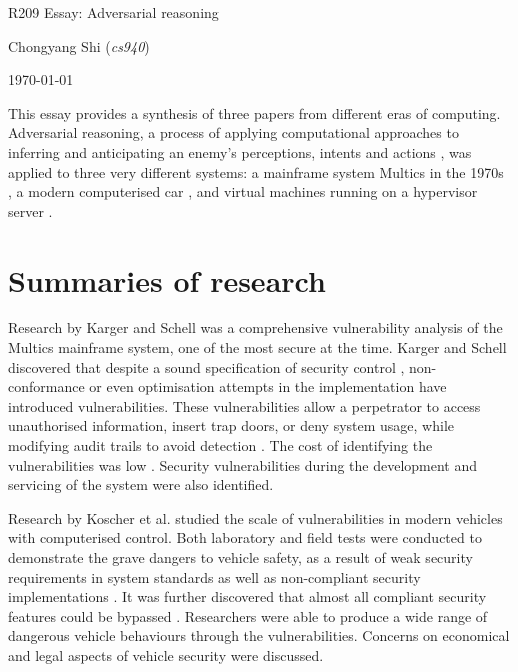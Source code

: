 \documentclass[11pt]{article}
\begin{document}
\centerline{\Large R209 Essay:  Adversarial reasoning}
\vspace{2em}
\centerline{\large Chongyang Shi (\emph{cs940})}
\vspace{1em}
\centerline{\large \today}
\vspace{1em}

This essay provides a synthesis of three papers from different eras of computing. Adversarial reasoning, a process of applying computational approaches to inferring and anticipating an enemy's perceptions, intents and actions \cite{kott2015toward}, was applied to three very different systems: a mainframe system Multics in the 1970s \cite{karger1974multics}, a modern computerised car \cite{koscher2010experimental}, and virtual machines running on a hypervisor server \cite{razavi2016flip}.

\section{Summaries of research}

Research by Karger and Schell \cite{karger1974multics} was a comprehensive vulnerability analysis of the Multics mainframe system, one of the most secure at the time. Karger and Schell discovered that despite a sound specification of security control \cite[3.1]{karger1974multics}, non-conformance \cite[3.2.1]{karger1974multics} or even optimisation attempts \cite[3.3.2]{karger1974multics} in the implementation have introduced vulnerabilities. These vulnerabilities allow a perpetrator to access unauthorised information, insert trap doors, or deny system usage, while modifying audit trails to avoid detection \cite[3.4.4]{karger1974multics}. The cost of identifying the vulnerabilities was low \cite[Tb. 3]{karger1974multics}. Security vulnerabilities during the development and servicing of the system were also identified. 

Research by Koscher et al. \cite{koscher2010experimental} studied the scale of vulnerabilities in modern vehicles with computerised control. Both laboratory and field tests were conducted to demonstrate the grave dangers to vehicle safety, as a result of weak security requirements in system standards \cite[IV. B.]{koscher2010experimental} as well as non-compliant security implementations \cite[IV. C.]{koscher2010experimental}. It was further discovered that almost all compliant security features could be bypassed \cite[IV. B., V. A.]{koscher2010experimental}. Researchers were able to produce a wide range of dangerous vehicle behaviours through the vulnerabilities. Concerns on economical and legal aspects of vehicle security were discussed.
\end{document}
